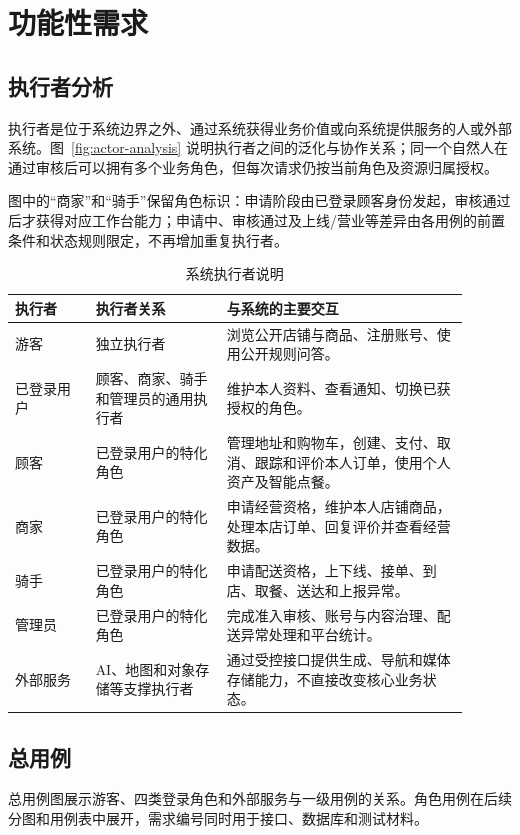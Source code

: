 \section{功能性需求}

\subsection{执行者分析}

执行者是位于系统边界之外、通过系统获得业务价值或向系统提供服务的人或外部系统。图~\ref{fig:actor-analysis} 说明执行者之间的泛化与协作关系；同一个自然人在通过审核后可以拥有多个业务角色，但每次请求仍按当前角色及资源归属授权。

图中的“商家”和“骑手”保留角色标识：申请阶段由已登录顾客身份发起，审核通过后才获得对应工作台能力；申请中、审核通过及上线/营业等差异由各用例的前置条件和状态规则限定，不再增加重复执行者。


\begin{longtable}{|L{0.16\linewidth}|L{0.26\linewidth}|L{0.48\linewidth}|}
\caption{系统执行者说明}\label{tab:actors}\\ \hline
\textbf{执行者} & \textbf{执行者关系} & \textbf{与系统的主要交互} \\ \hline
游客 & 独立执行者 & 浏览公开店铺与商品、注册账号、使用公开规则问答。 \\ \hline
已登录用户 & 顾客、商家、骑手和管理员的通用执行者 & 维护本人资料、查看通知、切换已获授权的角色。 \\ \hline
顾客 & 已登录用户的特化角色 & 管理地址和购物车，创建、支付、取消、跟踪和评价本人订单，使用个人资产及智能点餐。 \\ \hline
商家 & 已登录用户的特化角色 & 申请经营资格，维护本人店铺商品，处理本店订单、回复评价并查看经营数据。 \\ \hline
骑手 & 已登录用户的特化角色 & 申请配送资格，上下线、接单、到店、取餐、送达和上报异常。 \\ \hline
管理员 & 已登录用户的特化角色 & 完成准入审核、账号与内容治理、配送异常处理和平台统计。 \\ \hline
外部服务 & AI、地图和对象存储等支撑执行者 & 通过受控接口提供生成、导航和媒体存储能力，不直接改变核心业务状态。 \\ \hline
\end{longtable}

\subsection{总用例}


总用例图展示游客、四类登录角色和外部服务与一级用例的关系。角色用例在后续分图和用例表中展开，需求编号同时用于接口、数据库和测试材料。
